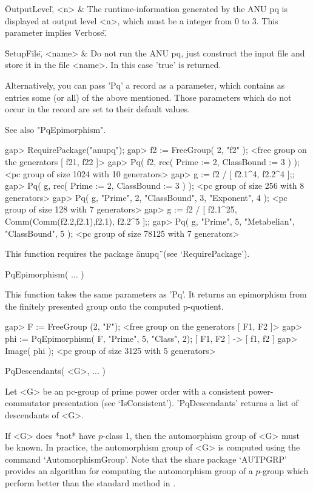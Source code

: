 \"OutputLevel\", <n> &
    The runtime-information  generated by the  ANU  pq  is  displayed  at
    output  level  <n>,  which  must  be a  integer from  0 to  3.   This
    parameter implies \"Verbose\".

\"SetupFile\", <name> &
    Do not run the ANU pq, just  construct the input file and store it in
    the file <name>. In this case 'true' is returned.
\enditems

Alternatively, you can pass 'Pq' a record as a parameter, which  contains
as entries some (or all)  of the above mentioned.  Those parameters which
do not occur in the record are set to their default values.

See also "PqEpimorphism".

\beginexample
    gap> RequirePackage("anupq");
    gap> f2 := FreeGroup( 2, "f2" );
    <free group on the generators [ f21, f22 ]>
    gap> Pq( f2, rec( Prime := 2,  ClassBound := 3 ) );
    <pc group of size 1024 with 10 generators>
    gap> g := f2 / [ f2.1^4, f2.2^4 ];;
    gap> Pq( g, rec( Prime := 2, ClassBound := 3 ) );
    <pc group of size 256 with 8 generators>
    gap> Pq( g, "Prime", 2, "ClassBound", 3, "Exponent", 4 );
    <pc group of size 128 with 7 generators>
    gap> g := f2 / [ f2.1^25, Comm(Comm(f2.2,f2.1),f2.1), f2.2^5 ];;
    gap> Pq( g, "Prime", 5, "Metabelian", "ClassBound", 5 );
    <pc group of size 78125 with 7 generators>
\endexample

This function requires the package \"anupq\"\ (see `RequirePackage').

\>PqEpimorphism( ... )

This function takes the same parameters as 'Pq'.  It returns an
epimorphism from the finitely presented group onto the computed
p-quotient.

\beginexample
    gap> F := FreeGroup (2, "F");
    <free group on the generators [ F1, F2 ]>
    gap>  phi := PqEpimorphism( F, "Prime", 5, "Class", 2);
    [ F1, F2 ] -> [ f1, f2 ]
    gap> Image( phi );
    <pc group of size 3125 with 5 generators>
\endexample


\>PqDescendants( <G>, ... )

Let  <G>  be  an  pc-group   of  prime  power  order  with  a  consistent
power-commutator  presentation   (see  `IsConsistent').   'PqDescendants'
returns a list of descendants of <G>.

If <G>  does *not* have $p$-class  1, then the automorphism  group of <G>
must be  known.  In practice, the  automorphism group of  <G> is computed
using the {\GAP} command `AutomorphismGroup'.  Note that the {\GAP} share
package `AUTPGRP'  provides an  algorithm for computing  the automorphism
group of  a $p$-group  which perform better  than the standard  method in
{\GAP}.

